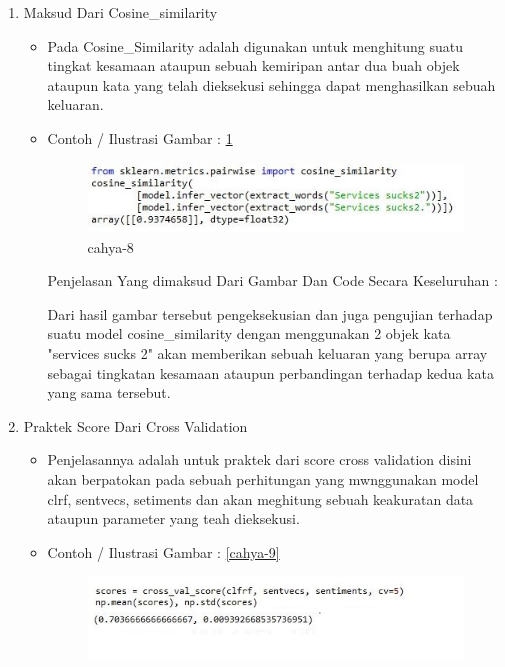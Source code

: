 \begin{enumerate}
\begin{itemize}
\par
\end{itemize}
\item Maksud Dari Cosine\_similarity
\begin{itemize}
\item Pada Cosine\_Similarity adalah digunakan untuk menghitung suatu tingkat kesamaan ataupun sebuah  kemiripan antar dua buah objek ataupun kata yang telah dieksekusi sehingga dapat menghasilkan sebuah keluaran.
\item Contoh / Ilustrasi Gambar : \ref{cahya-8}
\par
\begin{figure}[!hbtp]
\centering
\includegraphics[scale=0.3]{figures/cahya-8.jpg}
\caption{cahya-8}
\label{cahya-8}
\end{figure}
\par
\par Penjelasan  Yang dimaksud Dari Gambar Dan Code Secara Keseluruhan : 
\par Dari hasil gambar tersebut pengeksekusian dan juga pengujian terhadap suatu model cosine\_similarity dengan menggunakan 2 objek kata "services sucks 2" akan memberikan sebuah keluaran yang berupa array sebagai tingkatan kesamaan ataupun perbandingan terhadap kedua kata yang sama tersebut.
\par
\end{itemize}
\item Praktek Score Dari Cross Validation
\begin{itemize}
\item Penjelasannya adalah  untuk praktek dari score cross validation disini akan berpatokan pada sebuah perhitungan yang mwnggunakan model clrf, sentvecs, setiments dan  akan meghitung sebuah keakuratan data ataupun parameter yang teah dieksekusi.
\item Contoh / Ilustrasi Gambar : \ref{cahya-9}
\par
\begin{figure}[!hbtp]
\centering
\includegraphics[scale=0.3]{figures/cahya-9.jpg}

\end{figure}
\end{itemize}
\end{enumerate}
